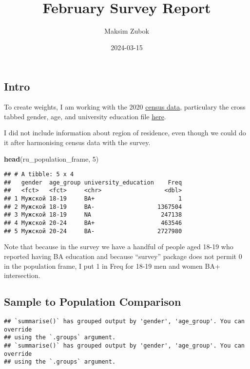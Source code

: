 \documentclass[
]{article}
\title{February Survey Report}
\author{Maksim Zubok}
\date{2024-03-15}
\newenvironment{Shaded}{\begin{snugshade}}{\end{snugshade}}
\newcommand{\DecValTok}[1]{\textcolor[rgb]{0.00,0.00,0.81}{#1}}
\newcommand{\FunctionTok}[1]{\textcolor[rgb]{0.13,0.29,0.53}{\textbf{#1}}}
\newcommand{\NormalTok}[1]{#1}
\begin{document}
\maketitle

\hypertarget{intro}{%
\subsection{Intro}\label{intro}}

To create weights, I am working with the 2020
\href{https://github.com/antndlcrx/nonviolent-repression/blob/main/data/surveys/Tom3_tab1_VPN-2020.xlsx}{census
data}, particulary the cross tabbed gender, age, and university
education file
\href{https://github.com/antndlcrx/nonviolent-repression/blob/main/data/surveys/ru_population_frame.csv}{here}.

I did not include information about region of residence, even though we
could do it after harmonising census data with the survey.

\begin{Shaded}
\begin{Highlighting}[]
\FunctionTok{head}\NormalTok{(ru\_population\_frame, }\DecValTok{5}\NormalTok{)}
\end{Highlighting}
\end{Shaded}

\begin{verbatim}
## # A tibble: 5 x 4
##   gender  age_group university_education    Freq
##   <fct>   <fct>     <chr>                  <dbl>
## 1 Мужской 18-19     BA+                        1
## 2 Мужской 18-19     BA-                  1367504
## 3 Мужской 18-19     NA                    247138
## 4 Мужской 20-24     BA+                   463546
## 5 Мужской 20-24     BA-                  2727980
\end{verbatim}

Note that because in the survey we have a handful of people aged 18-19
who reported having BA education and because ``survey'' package does not
permit 0 in the population frame, I put 1 in Freq for 18-19 men and
women BA+ intersection.

\hypertarget{sample-to-population-comparison}{%
\subsection{Sample to Population
Comparison}\label{sample-to-population-comparison}}

\begin{verbatim}
## `summarise()` has grouped output by 'gender', 'age_group'. You can override
## using the `.groups` argument.
## `summarise()` has grouped output by 'gender', 'age_group'. You can override
## using the `.groups` argument.
\end{verbatim}
\end{document}

